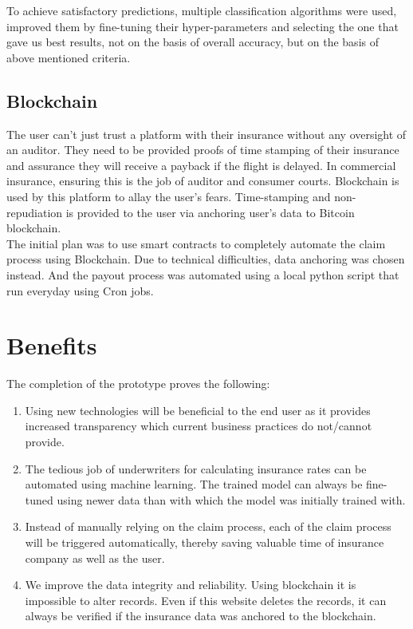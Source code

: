 To achieve satisfactory predictions, multiple classification algorithms were used, improved them by fine-tuning their hyper-parameters and selecting the one that gave us best results, not on the basis of overall accuracy, but on the basis of above mentioned criteria.

\subsection{Blockchain}
The user can't just trust a platform with their insurance without any oversight of an auditor. They need to be provided proofs of time stamping of their insurance and assurance they will receive a payback if the flight is delayed. In commercial insurance, ensuring this is the job of auditor and consumer courts. Blockchain is used by this platform to allay the user's fears. Time-stamping and non-repudiation is provided to the user via anchoring user's data to Bitcoin blockchain. 
\\The initial plan was to use smart contracts to completely automate the claim process using Blockchain. Due to technical difficulties, data anchoring was chosen instead. And the payout process was automated using a local python script that run everyday using Cron jobs. 


\section{Benefits}
The completion of the prototype proves the following:
\begin{enumerate}
    \item Using new technologies will be beneficial to the end user as it provides increased transparency which current business practices do not/cannot provide.
    \item The tedious job of underwriters for calculating insurance rates can be automated using machine learning. The trained model can always be fine-tuned using newer data than with which the model was initially trained with. 
    \item Instead of manually relying on the claim process, each of the claim process will be triggered automatically, thereby saving valuable time of insurance company as well as the user.
    \item We improve the data integrity and reliability. Using blockchain it is impossible to alter records. Even if this website deletes the records, it can always be verified if the insurance data was anchored to the blockchain.
\end{enumerate}

